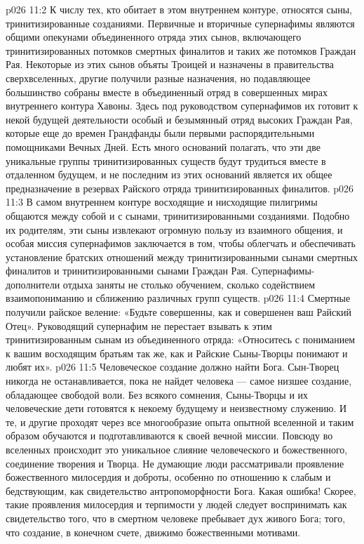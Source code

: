 \vs p026 11:2 \pc К числу тех, кто обитает в этом внутреннем контуре, относятся сыны, тринитизированные созданиями. Первичные и вторичные супернафимы являются общими опекунами объединенного отряда этих сынов, включающего тринитизированных потомков смертных финалитов и таких же потомков Граждан Рая. Некоторые из этих сынов объяты Троицей и назначены в правительства сверхвселенных, другие получили разные назначения, но подавляющее большинство собраны вместе в объединенный отряд в совершенных мирах внутреннего контура Хавоны. Здесь под руководством супернафимов их готовит к некой будущей деятельности особый и безымянный отряд высоких Граждан Рая, которые еще до времен Грандфанды были первыми распорядительными помощниками Вечных Дней. Есть много оснований полагать, что эти две уникальные группы тринитизированных существ будут трудиться вместе в отдаленном будущем, и не последним из этих оснований является их общее предназначение в резервах Райского отряда тринитизированных финалитов.
\vs p026 11:3 В самом внутреннем контуре восходящие и нисходящие пилигримы общаются между собой и с сынами, тринитизированными созданиями. Подобно их родителям, эти сыны извлекают огромную пользу из взаимного общения, и особая миссия супернафимов заключается в том, чтобы облегчать и обеспечивать установление братских отношений между тринитизированными сынами смертных финалитов и тринитизированными сынами Граждан Рая. Супернафимы\hyp{}дополнители отдыха заняты не столько обучением, сколько содействием взаимопониманию и сближению различных групп существ.
\vs p026 11:4 Смертные получили райское веление: «Будьте совершенны, как и совершенен ваш Райский Отец». Руководящий супернафим не перестает взывать к этим тринитизированным сынам из объединенного отряда: «Относитесь с пониманием к вашим восходящим братьям так же, как и Райские Сыны\hyp{}Творцы понимают и любят их».
\vs p026 11:5 \pc Человеческое создание должно найти Бога. Сын\hyp{}Творец никогда не останавливается, пока не найдет человека --- самое низшее создание, обладающее свободой воли. Без всякого сомнения, Сыны\hyp{}Творцы и их человеческие дети готовятся к некоему будущему и неизвестному служению. И те, и другие проходят через все многообразие опыта опытной вселенной и таким образом обучаются и подготавливаются к своей вечной миссии. Повсюду во вселенных происходит это уникальное слияние человеческого и божественного, соединение творения и Творца. Не думающие люди рассматривали проявление божественного милосердия и доброты, особенно по отношению к слабым и бедствующим, как свидетельство антропоморфности Бога. Какая ошибка! Скорее, такие проявления милосердия и терпимости у людей следует воспринимать как свидетельство того, что в смертном человеке пребывает дух живого Бога; того, что создание, в конечном счете, движимо божественными мотивами.
